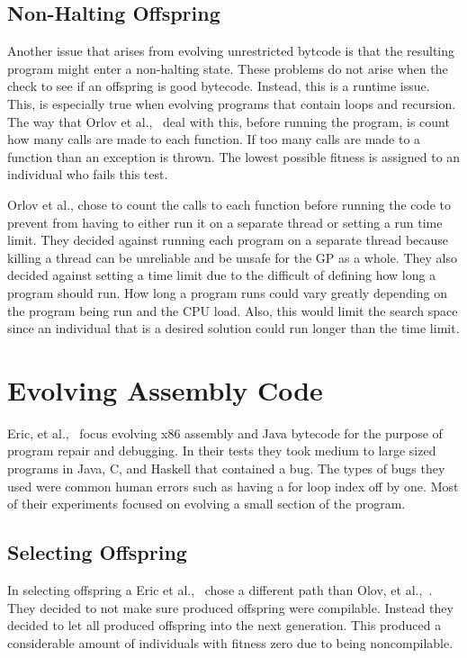 \documentclass{sig-alternate}
\begin{document}
\subsection{Non-Halting Offspring}
Another issue that arises from evolving unrestricted bytcode is that the resulting program might enter a non-halting state. These problems do not arise when the check to see if an offspring is good bytecode. Instead, this is a runtime issue. This, is especially true when evolving programs that contain loops and recursion.
The way that Orlov et al.,~\cite{FINCH:2011} deal with this, before running the program, is count how many calls are made to each function. If too many calls are made to a function than an exception is thrown. The lowest possible fitness is assigned to an individual who fails this test.

Orlov et al., chose to count the calls to each function before running the code to prevent from having to either run it on a separate thread or setting a run time limit. They decided against running each program on a separate thread because killing a thread can be unreliable and be unsafe for the GP as a whole. They also decided against setting a time limit due to the difficult of defining how long a program should run. How long a program runs could vary greatly depending on the program being run and the CPU load. Also, this would limit the search space since an individual that is a desired solution could run longer than the time limit.


\section{Evolving Assembly Code}
Eric, et al.,~\cite{Assembly:2010} focus evolving x86 assembly and Java bytecode for the purpose of program repair and debugging. In their tests they took medium to large sized programs in Java, C, and Haskell that contained a bug. The types of bugs they used were common human errors such as having a for loop index off by one. Most of their experiments focused on evolving a small section of the program.
\subsection{Selecting Offspring } 
In selecting offspring a Eric et al.,~\cite{Assembly:2010} chose a different path than Olov, et al.,~\cite{FINCH:2011}. They decided to not make sure produced offspring were compilable. Instead they decided to let all produced offspring into the next generation. This produced a considerable amount of individuals with fitness zero due to being noncompilable.
\end{document}
